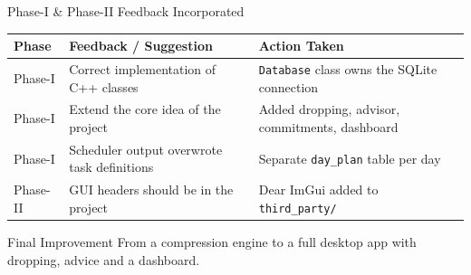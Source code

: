 \documentclass[aspectratio=169,11pt]{beamer}
\newcommand{\smallnote}[1]{%
\vspace{0.08cm}
{\scriptsize\color{GEUGrey}#1}
}
\begin{document}
\begin{frame}{Phase-I \& Phase-II Feedback Incorporated}

\scriptsize

\begin{center}

\renewcommand{\arraystretch}{1.35}

\begin{tabularx}{.96\textwidth}
{@{}p{2.1cm}X X@{}}

\toprule
\textbf{Phase} &
\textbf{Feedback / Suggestion} &
\textbf{Action Taken}\\
\midrule

Phase-I &
Correct implementation of C++ classes &
\texttt{Database} class owns the SQLite connection\\

Phase-I &
Extend the core idea of the project &
Added dropping, advisor, commitments, dashboard\\

Phase-I &
Scheduler output overwrote task definitions &
Separate \texttt{day\_plan} table per day\\

Phase-II &
GUI headers should be in the project &
Dear ImGui added to \texttt{third\_party/}\\


\bottomrule

\end{tabularx}

\end{center}

\vfill

\begin{block}{Final Improvement}
From a compression engine to a full desktop app with dropping, advice and a dashboard.
\end{block}

\smallnote{

}

\end{frame}
\end{document}
